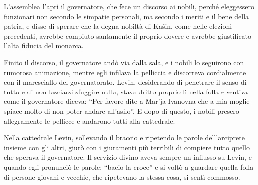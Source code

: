L'assemblea l'aprì il governatore, che fece un discorso ai nobili, perché eleggessero funzionari non secondo le simpatie personali, ma secondo i meriti e il bene della patria, e disse di sperare che la degna nobiltà di Kašin, come nelle elezioni precedenti, avrebbe compiuto santamente il proprio dovere e avrebbe giustificato l'alta fiducia del monarca. 

Finito il discorso, il governatore andò via dalla sala, e i nobili lo seguirono con rumorosa animazione, mentre egli infilava la pelliccia e discorreva cordialmente con il maresciallo del governatorato. Levin, desiderando di penetrare il senso di tutto e di non lasciarsi sfuggire nulla, stava dritto proprio lì nella folla e sentiva come il governatore diceva: ``Per favore dite a Mar'ja Ivanovna che a mia moglie spiace molto di non poter andare all'asilo''. E dopo di questo, i nobili presero allegramente le pellicce e andarono tutti alla cattedrale. 

Nella cattedrale Levin, sollevando il braccio e ripetendo le parole dell'arciprete insieme con gli altri, giurò con i giuramenti più terribili di compiere tutto quello che sperava il governatore. Il servizio divino aveva sempre un influsso su Levin, e quando egli pronunciò le parole: ``bacio la croce'' e si voltò a guardare quella folla di persone giovani e vecchie, che ripetevano la stessa cosa, si sentì commosso. 

